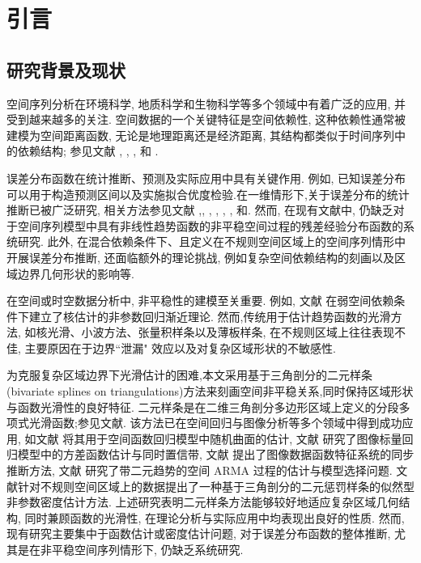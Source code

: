 \documentclass[a4paper,openay,14pt]{ctexbook}
\numberwithin{equation}{section}
\numberwithin{lem}{section}
\newcommand{\chapterwithfancyheader}[1]{  
    \chapter{#1} %
    \thispagestyle{fancy} %
}
\begin{document}
\baselineskip=30pt


\clearpage %
\tableofcontents
\thispagestyle{empty}
\listoftables
\let\cleardoublepage\clearpage
\listoffigures

\mainmatter
\pagestyle{fancy}\fancyhf{}
\fancyhead[EL]{\leftmark}
\fancyhead[OR]{\leftmark}
\fancyfoot[C]{\thepage }

\chapterwithfancyheader{引言}
\section{研究背景及现状}

空间序列分析在环境科学, 地质科学和生物科学等多个领域中有着广泛的应用, 并受到越来越多的关注. 
空间数据的一个关键特征是空间依赖性, 这种依赖性通常被建模为空间距离函数, 
无论是地理距离还是经济距离, 其结构都类似于时间序列中的依赖结构; 
参见文献 \cite{whittle1954stationary}, \cite{anselin1980estimation}, 
\cite{yao2006gaussian}, \cite{robinson2011asymptotic} 和 \cite{cressie2015statistics}.

误差分布函数在统计推断、预测及实际应用中具有关键作用. 例如, 已知误差分布可以用于构造预测区间以及实施拟合优度检验.在一维情形下,关于误差分布的统计推断已被广泛研究, 相关方法参见文献
\cite{akritas2001non},\cite{cheng2002consistency}, \cite{cheng2005asymptotic}, \cite{muller2007estimating}, \cite{chan2008residual}, \cite{kiwitt2012estimating}, \cite{gu2021smooth}和\cite{zhong2025inference}.
然而, 在现有文献中, 仍缺乏对于空间序列模型中具有非线性趋势函数的非平稳空间过程的残差经验分布函数的系统研究. 此外, 在混合依赖条件下、且定义在不规则空间区域上的空间序列情形中开展误差分布推断, 还面临额外的理论挑战, 例如复杂空间依赖结构的刻画以及区域边界几何形状的影响等.

在空间或时空数据分析中, 非平稳性的建模至关重要. 例如, 文献\cite{robinson2011asymptotic} 在弱空间依赖条件下建立了核估计的非参数回归渐近理论.  然而,传统用于估计趋势函数的光滑方法, 如核光滑、小波方法、张量积样条以及薄板样条, 在不规则区域上往往表现不佳, 主要原因在于边界``泄漏" 效应以及对复杂区域形状的不敏感性.

为克服复杂区域边界下光滑估计的困难,本文采用基于三角剖分的二元样条(bivariate splines on triangulations)方法来刻画空间非平稳关系,同时保持区域形状与函数光滑性的良好特征. 二元样条是在二维三角剖分多边形区域上定义的分段多项式光滑函数;参见文献\cite{lai2013bivariate}. 该方法已在空间回归与图像分析等多个领域中得到成功应用, 如文献\cite{guillas2010bivariate} 将其用于空间函数回归模型中随机曲面的估计, 文献\cite{yu2021multivariate} 研究了图像标量回归模型中的方差函数估计与同时置信带, 文献\cite{hu2024statistical} 提出了图像数据函数特征系统的同步推断方法, 文献\cite{zhang2025oracally} 研究了带二元趋势的空间 ARMA 过程的估计与模型选择问题. 文献\cite{das2025nonparametric}针对不规则空间区域上的数据提出了一种基于三角剖分的二元惩罚样条的似然型非参数密度估计方法. 上述研究表明二元样条方法能够较好地适应复杂区域几何结构, 同时兼顾函数的光滑性, 在理论分析与实际应用中均表现出良好的性质. 然而, 现有研究主要集中于函数估计或密度估计问题, 对于误差分布函数的整体推断, 尤其是在非平稳空间序列情形下, 仍缺乏系统研究.
\end{document}
